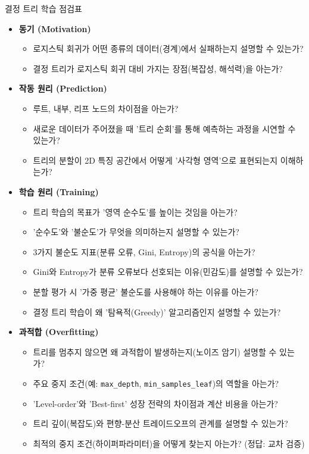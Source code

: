 \documentclass[11pt,a4paper]{book}
\theoremstyle{definition}
\begin{document}
\begin{tcolorbox}{결정 트리 학습 점검표}
    \begin{itemize}
        \item \textbf{동기 (Motivation)}
        \begin{itemize}
            \item[$\square$] 로지스틱 회귀가 어떤 종류의 데이터(경계)에서 실패하는지 설명할 수 있는가?
            \item[$\square$] 결정 트리가 로지스틱 회귀 대비 가지는 장점(복잡성, 해석력)을 아는가?
        \end{itemize}
        \item \textbf{작동 원리 (Prediction)}
        \begin{itemize}
            \item[$\square$] 루트, 내부, 리프 노드의 차이점을 아는가?
            \item[$\square$] 새로운 데이터가 주어졌을 때 '트리 순회'를 통해 예측하는 과정을 시연할 수 있는가?
            \item[$\square$] 트리의 분할이 2D 특징 공간에서 어떻게 '사각형 영역'으로 표현되는지 이해하는가?
        \end{itemize}
        \item \textbf{학습 원리 (Training)}
        \begin{itemize}
            \item[$\square$] 트리 학습의 목표가 '영역 순수도'를 높이는 것임을 아는가?
            \item[$\square$] '순수도'와 '불순도'가 무엇을 의미하는지 설명할 수 있는가?
            \item[$\square$] 3가지 불순도 지표(분류 오류, Gini, Entropy)의 공식을 아는가?
            \item[$\square$] Gini와 Entropy가 분류 오류보다 선호되는 이유(민감도)를 설명할 수 있는가?
            \item[$\square$] 분할 평가 시 '가중 평균' 불순도를 사용해야 하는 이유를 아는가?
            \item[$\square$] 결정 트리 학습이 왜 '탐욕적(Greedy)' 알고리즘인지 설명할 수 있는가?
        \end{itemize}
        \item \textbf{과적합 (Overfitting)}
        \begin{itemize}
            \item[$\square$] 트리를 멈추지 않으면 왜 과적합이 발생하는지(노이즈 암기) 설명할 수 있는가?
            \item[$\square$] 주요 중지 조건(예: \texttt{max\_depth}, \texttt{min\_samples\_leaf})의 역할을 아는가?
            \item[$\square$] 'Level-order'와 'Best-first' 성장 전략의 차이점과 계산 비용을 아는가?
            \item[$\square$] 트리 깊이(복잡도)와 편향-분산 트레이드오프의 관계를 설명할 수 있는가?
            \item[$\square$] 최적의 중지 조건(하이퍼파라미터)을 어떻게 찾는지 아는가? (정답: 교차 검증)
        \end{itemize}
    \end{itemize}
\end{tcolorbox}
\end{document}
